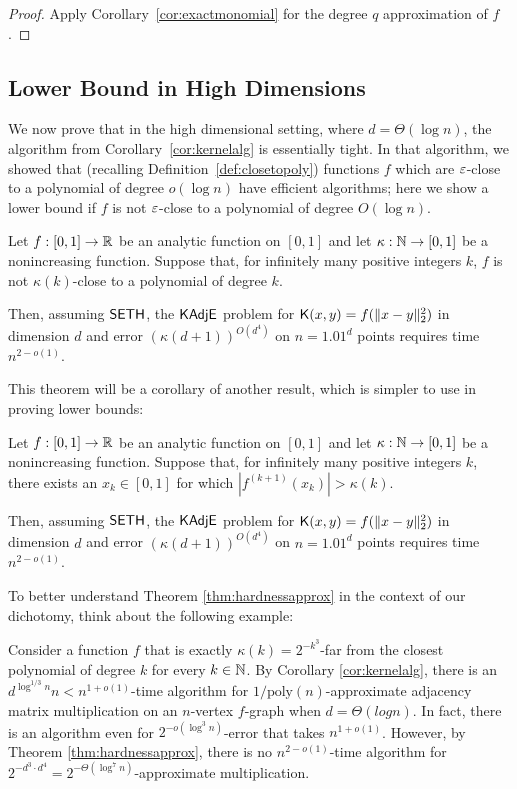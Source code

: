 \begin{proof}
Apply Corollary~\ref{cor:exactmonomial} for the degree $q$ approximation of $f$.
\end{proof}


\subsection{Lower Bound in High Dimensions} \label{sec:lbhighdim}

We now prove that in the high dimensional setting, where $d = \Theta(\log n)$, the algorithm from Corollary~\ref{cor:kernelalg} is essentially tight. In that algorithm, we showed that (recalling Definition~\ref{def:closetopoly}) functions $f$ which are $\varepsilon$-close to a polynomial of degree $o(\log n)$ have efficient algorithms; here we show a lower bound if $f$ is not $\varepsilon$-close to a polynomial of degree $O(\log n)$.

\begin{theorem} \label{thm:hardnessapprox}
Let $f : [0,1] \to {\mathbb R}$ be an analytic function on $[0,1]$ and let $\kappa: {\mathbb N} \to [0,1]$ be a nonincreasing function. Suppose that, for infinitely many positive integers $k$, $f$ is not $\kappa(k)$-close to a polynomial of degree $k$.

Then, assuming $\mathsf{SETH}$, the $\mathsf{KAdjE}$ problem for $\mathsf{K}(x,y) = f(\|x-y\|_2^2)$ in dimension $d$ and error $(\kappa(d+1))^{O(d^4)}$ on $n=1.01^d$ points requires time $n^{2 - o(1)}$.
\end{theorem}

This theorem will be a corollary of another result, which is simpler to use in proving lower bounds:

\begin{theorem} \label{thm:hardnessapprox-easy}
Let $f : [0,1] \to {\mathbb R}$ be an analytic function on $[0,1]$ and let $\kappa: {\mathbb N} \to [0,1]$ be a nonincreasing function. Suppose that, for infinitely many positive integers $k$, there exists an $x_k\in [0,1]$ for which $|f^{(k+1)}(x_k)| > \kappa(k)$.

Then, assuming $\mathsf{SETH}$, the $\mathsf{KAdjE}$ problem for $\mathsf{K}(x,y) = f(\|x-y\|_2^2)$ in dimension $d$ and error $(\kappa(d+1))^{O(d^4)}$ on $n=1.01^d$ points requires time $n^{2 - o(1)}$.
\end{theorem}

To better understand Theorem \ref{thm:hardnessapprox} in the context of our dichotomy, think about the following example:

\begin{example}
Consider a function $f$ that is exactly $\kappa(k) = 2^{-k^3}$-far from the closest polynomial of degree $k$ for every $k\in {\mathbb N}$. By Corollary \ref{cor:kernelalg}, there is an $d^{\log^{1/3} n} n < n^{1+o(1)}$-time algorithm for $1/\text{poly}(n)$-approximate adjacency matrix multiplication on an $n$-vertex $f$-graph when $d = \Theta(log n)$. In fact, there is an algorithm even for $2^{-o(\log^3 n)}$-error that takes $n^{1+o(1)}$. However, by Theorem \ref{thm:hardnessapprox}, there is no $n^{2-o(1)}$-time algorithm for $2^{-d^3\cdot d^4} = 2^{-\Theta(\log^7 n)}$-approximate multiplication. 
\end{example}

